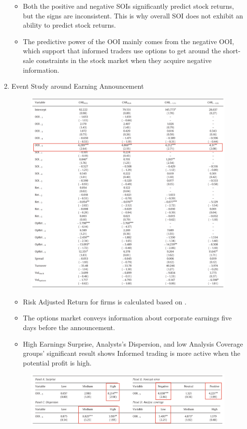 \documentclass[10pt]{report}
\begin{document}
\begin{enumerate}
\begin{itemize}
        \item Both the positive and negative SOIs significantly predict stock returns, but the signs are inconsistent. This is why overall SOI does not exhibit an ability to predict stock returns.
        \item The predictive power of the OOI mainly comes
from the negative OOI, which support that
informed traders use options to get around the short-sale
constraints in the stock market when they acquire negative
information.
    \end{itemize}
    \item Event Study around Earning Announcement
    \begin{figure}[!h]
        \centering
        \includegraphics[width=0.95\linewidth]{p11.png}
    \end{figure}
    \begin{itemize}
        \item Risk Adjusted Return for firms is calculated based on \citet{Carhart1997OnPI}.
        \item The options market conveys information about corporate earnings five days before the announcement.
        \item High Earnings Surprise, Analysts's Dispersion, and low Analysis Coverage groups' significant result shows Informed trading is more active when the potential profit is high.
    \end{itemize}
    \begin{figure}[!h]
        \centering
        \includegraphics[width=1\linewidth]{p12.png}
    \end{figure}
\end{enumerate}
\end{document}
